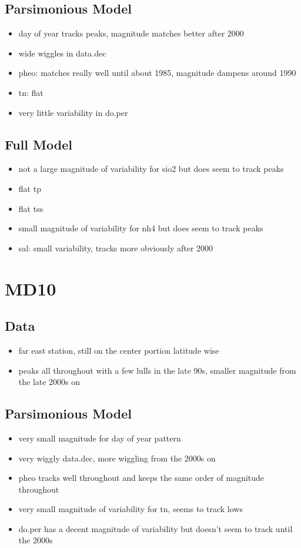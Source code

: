 \documentclass[12pt]{amsart}
\begin{document}
\subsection{Parsimonious Model}
\begin{itemize}
\item day of year tracks peaks, magnitude matches better after 2000
\item wide wiggles in data.dec
\item pheo:  matches really well until about 1985, magnitude dampens around 1990
\item tn: flat
\item very little variability in do.per
\end{itemize}
\subsection{Full Model}
\begin{itemize}
\item not a large magnitude of variability for sio2 but does seem to track peaks
\item flat tp
\item flat tss
\item small magnitude of variability for nh4 but does seem to track peaks
\item sal: small variability, tracks more obviously after 2000
\end{itemize}

\section{MD10}
\subsection{Data}
\begin{itemize}
\item far east station, still on the center portion latitude wise
\item peaks all throughout with a few lulls in the late 90s, smaller magnitude from the late 2000s on
\end{itemize}
\subsection{Parsimonious Model}
\begin{itemize}
\item very small magnitude for day of year pattern
\item very wiggly data.dec, more wiggling from the 2000s on
\item pheo tracks well throughout and keeps the same order of magnitude throughout
\item very small magnitude of variability for tn, seems to track lows
\item do.per has a decent magnitude of variability but doesn't seem to track until the 2000s
\end{itemize}
\end{document}
